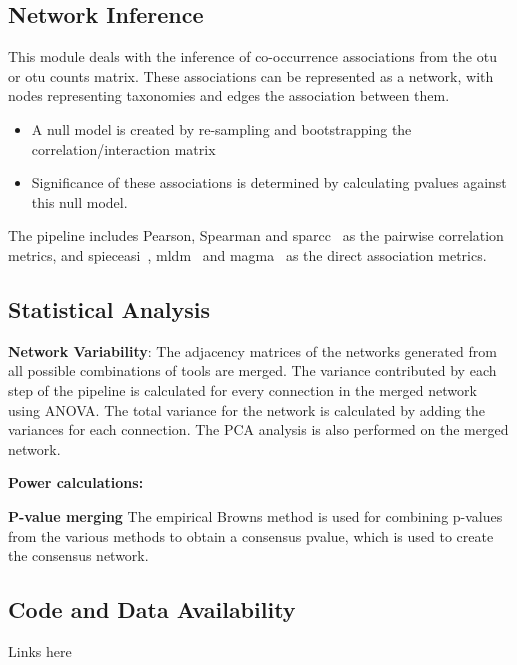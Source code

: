   \subsection*{Network Inference}
  \vspace{-5mm}
  This module deals with the inference of co-occurrence associations from the \ac{otu} or \ac{otu} counts matrix.
  These associations can be represented as a network, with nodes representing taxonomies and edges the association between them.
  \begin{itemize}
    \item A null model is created by re-sampling and bootstrapping the correlation/interaction matrix
    \item Significance of these associations is determined by calculating pvalues against this null model.
  \end{itemize}
  The pipeline includes Pearson, Spearman and \ac{sparcc}~\cite{Friedman2012} as the pairwise correlation metrics, and \ac{spieceasi}~\cite{Kurtz2015}, \ac{mldm}~\cite{Yang2017} and \ac{magma}~\cite{} as the direct association metrics.

  \subsection*{Statistical Analysis}

  \textbf{Network Variability}:
  The adjacency matrices of the networks generated from all possible combinations of tools are merged.
  The variance contributed by each step of the pipeline is calculated for every connection in the merged network using ANOVA.
  The total variance for the network is calculated by adding the variances for each connection.
  The PCA analysis is also performed on the merged network.

  \textbf{Power calculations:}

  \textbf{P-value merging}
  The empirical Browns method is used for combining p-values from the various methods to obtain a consensus pvalue, which is used to create the consensus network.

  \subsection*{Code and Data Availability}

  Links here
